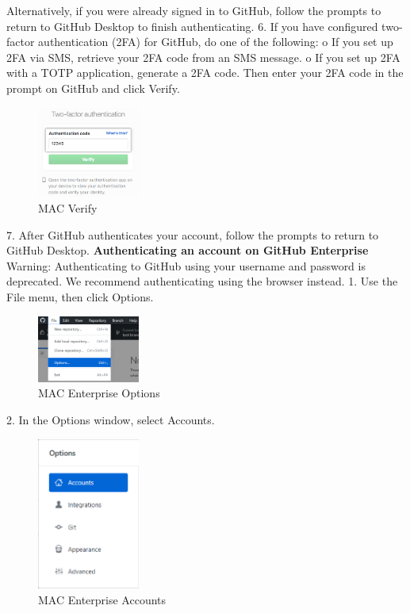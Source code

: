 Alternatively, if you were already signed in to GitHub, follow the prompts to return to GitHub Desktop to finish authenticating.
6.	If you have configured two-factor authentication (2FA) for GitHub, do one of the following:
o	If you set up 2FA via SMS, retrieve your 2FA code from an SMS message.
o	If you set up 2FA with a TOTP application, generate a 2FA code.
Then enter your 2FA code in the prompt on GitHub and click Verify.
\begin{figure}[ht]
    \centering
    \includegraphics[width=0.3\textwidth]{figures/MAC Verify.png}
    \caption{MAC Verify}
\end{figure}

7.	After GitHub authenticates your account, follow the prompts to return to GitHub Desktop.
\textbf{Authenticating an account on GitHub Enterprise}
Warning: Authenticating to GitHub using your username and password is deprecated. We recommend authenticating using the browser instead.
1.	Use the File menu, then click Options.

\begin{figure}[ht]
    \centering
    \includegraphics[width=0.3\textwidth]{figures/MAC EN Options.png}
    \caption{MAC Enterprise Options}
\end{figure}

2.	In the Options window, select Accounts.
\begin{figure}[ht]
    \centering
    \includegraphics[width=0.3\textwidth]{figures/MAC EN Accounts.png}
    \caption{MAC Enterprise Accounts}
\end{figure}


